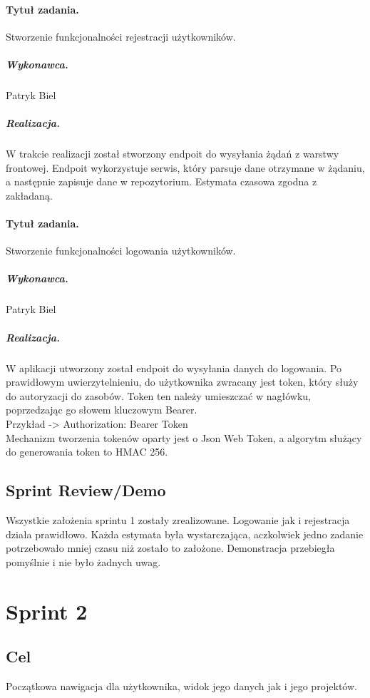 ﻿\documentclass[a4paper]{article}
\begin{document}
\paragraph{Tytuł zadania.} Stworzenie funkcjonalności rejestracji użytkowników.
\subparagraph{Wykonawca.} Patryk Biel
\subparagraph{Realizacja.} W trakcie realizacji został stworzony endpoit do wysyłania żądań z warstwy frontowej. 
Endpoit wykorzystuje serwis, który parsuje dane otrzymane w żądaniu, a następnie zapisuje dane w repozytorium. Estymata czasowa zgodna z zakładaną.


\paragraph{Tytuł zadania.} Stworzenie funkcjonalności logowania użytkowników.
\subparagraph{Wykonawca.} Patryk Biel
\subparagraph{Realizacja.} W aplikacji utworzony został endpoit do wysyłania danych do logowania. Po prawidłowym uwierzytelnieniu, do użytkownika zwracany jest token, który służy do autoryzacji do zasobów. Token ten należy umieszczać w nagłówku, poprzedzając go słowem kluczowym Bearer. \\
Przykład -> Authorization: Bearer Token\\
Mechanizm tworzenia tokenów oparty jest o Json Web Token, a algorytm służący do generowania token to HMAC 256.



\subsection{Sprint Review/Demo}

Wszystkie założenia sprintu 1 zostały zrealizowane. Logowanie jak i rejestracja działa prawidłowo. Każda estymata była wystarczająca, aczkolwiek jedno zadanie potrzebowało mniej czasu niż zostało to założone. Demonstracja przebiegła pomyślnie i nie było żadnych uwag. 









\section{Sprint 2}

\subsection{Cel} Początkowa nawigacja dla użytkownika, widok jego danych jak i jego projektów.
\end{document}
